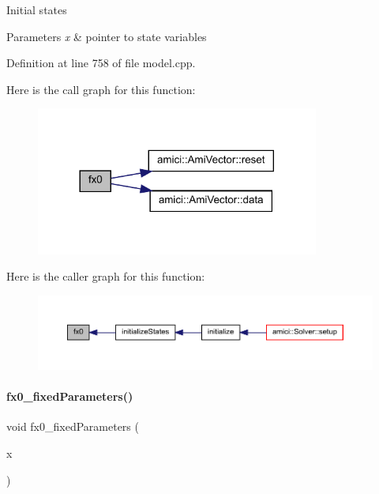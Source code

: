 Initial states 
\begin{DoxyParams}{Parameters}
{\em x} & pointer to state variables \\
\hline
\end{DoxyParams}


Definition at line 758 of file model.\+cpp.

Here is the call graph for this function\+:
\nopagebreak
\begin{figure}[H]
\begin{center}
\leavevmode
\includegraphics[width=264pt]{classamici_1_1_model_aa9a9e12a414d9ac91249b63d01ab7bca_cgraph}
\end{center}
\end{figure}
Here is the caller graph for this function\+:
\nopagebreak
\begin{figure}[H]
\begin{center}
\leavevmode
\includegraphics[width=350pt]{classamici_1_1_model_aa9a9e12a414d9ac91249b63d01ab7bca_icgraph}
\end{center}
\end{figure}
\mbox{\label{classamici_1_1_model_ae517574d2a7c504c388438a08a1aed38}} 
\paragraph{\texorpdfstring{fx0\+\_\+fixed\+Parameters()}{fx0\_fixedParameters()}\hspace{0.1cm}{\footnotesize\ttfamily [1/2]}}
{\footnotesize\ttfamily void fx0\+\_\+fixed\+Parameters (\begin{DoxyParamCaption}\item[{\mbox{\hyperlink{classamici_1_1_ami_vector}{Ami\+Vector}} $\ast$}]{x }\end{DoxyParamCaption})}

